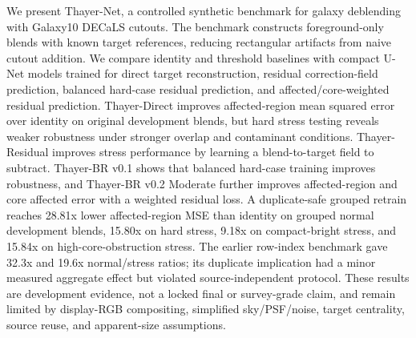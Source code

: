 We present Thayer-Net, a controlled synthetic benchmark for galaxy deblending
with Galaxy10 DECaLS cutouts. The benchmark constructs foreground-only blends
with known target references, reducing rectangular artifacts from naive cutout
addition. We compare identity and threshold baselines with compact U-Net models
trained for direct target reconstruction, residual correction-field prediction,
balanced hard-case residual prediction, and affected/core-weighted residual
prediction. Thayer-Direct improves affected-region mean squared error over
identity on original development blends, but hard stress testing reveals weaker
robustness under stronger overlap and contaminant conditions. Thayer-Residual
improves stress performance by learning a blend-to-target field to subtract.
Thayer-BR v0.1 shows that balanced hard-case training improves robustness, and
Thayer-BR v0.2 Moderate further improves affected-region and core affected
error with a weighted residual loss. A duplicate-safe grouped retrain reaches
28.81x lower affected-region MSE than identity on grouped normal development
blends, 15.80x on hard stress, 9.18x on compact-bright stress, and 15.84x on
high-core-obstruction stress. The earlier row-index benchmark gave 32.3x and
19.6x normal/stress ratios; its duplicate implication had a minor measured
aggregate effect but violated source-independent protocol. These results are
development evidence, not a locked final or survey-grade claim, and remain
limited by display-RGB compositing, simplified sky/PSF/noise, target centrality,
source reuse, and apparent-size assumptions.
